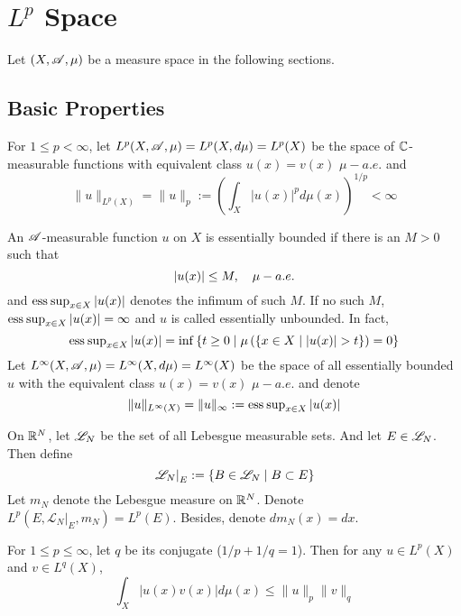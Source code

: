 \chapter{\texorpdfstring{$L^p$}{Lp} Space}
Let $(X,\mathscr{A},\mu)$ be a measure space in the following sections.

\section{Basic Properties}

For $1 \leq p < \infty$, let $L^p(X,\mathscr{A},\mu) = L^p(X,d\mu) = L^p(X)$ be the space of $\mathbb{C}$-measurable functions with equivalent class $u(x) = v(x)$ $\mu-a.e.$ and 
\begin{equation*}
	\|u\|_{L^p(X)} = \|u\|_{p} :=\left(\int_X|u(x)|^p d \mu(x)\right)^{1 / p} < \infty
\end{equation*}

\noindent An $\mathscr{A}$-measurable function $u$ on $X$ is essentially bounded if there is an $M > 0$ such that
\begin{equation*}
	\left\lvert u(x)\right\lvert \leq M,\quad \mu-a.e.
\end{equation*}
and $\operatorname{ess\:sup}_{x \in X}\left\lvert u(x)\right\lvert$ denotes the infimum of such $M$. If no such $M$, $\operatorname{ess\:sup}_{x \in X}\left\lvert u(x)\right\lvert = \infty$ and $u$ is called essentially unbounded. In fact,
\begin{equation}
	\operatorname{ess\:sup}_{x \in X}\left\lvert u(x)\right\lvert = \inf \left\{t \geq 0 \mid \mu\left(\left\{x \in X \mid \left\lvert u(x)\right\lvert > t\right\}\right) = 0\right\}
\end{equation}
Let $L^\infty(X,\mathscr{A},\mu) = L^\infty(X,d\mu) = L^\infty(X)$ be the space of all essentially bounded $u$ with the equivalent class $u(x) = v(x)$ $\mu-a.e.$ and denote
\begin{equation*}
	\|u\|_{L^{\infty}(X)} = \|u\|_{\infty}:=\operatorname{ess\:sup}_{x \in X}\left\lvert u(x)\right\lvert
\end{equation*}

\begin{rmk}
	On $\mathbb{R}^N$, let $\mathscr{L}_N$ be the set of all Lebesgue measurable sets. And let $E \in \mathscr{L}_N$. Then define
	\begin{equation*}
		\left.\mathscr{L}_N\right\lvert_E:=\left\{B \in \mathscr{L}_N \mid B \subset E\right\}
	\end{equation*}
	Let $m_N$ denote the Lebesgue measure on $\mathbb{R}^N$. Denote $L^p\left(E,\left.\mathscr{L}_N\right|_E, m_N\right) = L^p(E)$. Besides, denote $dm_N(x) = dx$.
\end{rmk}

\begin{prop}
	For $1 \leq p \leq \infty$, let $q$ be its conjugate ($1/p+1/q = 1$). Then for any $u \in L^p(X)$ and $v \in L^q(X)$,
	\begin{equation*}
		\int_X|u(x) v(x)| d \mu(x) \leq\|u\|_{p}\|v\|_{q}
	\end{equation*}
\end{prop}

